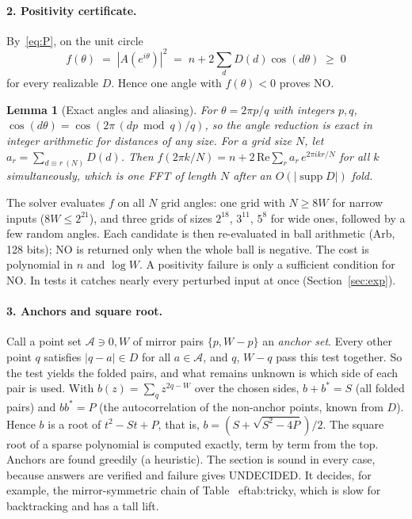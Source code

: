 \documentclass[11pt]{article}
\newtheorem{lemma}{Lemma}
\theoremstyle{definition}
\DeclareMathOperator{\supp}{supp}
\begin{document}
\paragraph{2. Positivity certificate.} By~\eqref{eq:P}, on the unit circle
\[
  f(\theta) \;=\; |A(e^{i\theta})|^2 \;=\; n + 2\sum_d D(d)\cos(d\theta) \;\ge\; 0
\]
for every realizable $D$. Hence one angle with $f(\theta)<0$ proves NO.

\begin{lemma}[Exact angles and aliasing]\label{lem:alias}
For $\theta=2\pi p/q$ with integers $p,q$, $\cos(d\theta)=\cos(2\pi\,(dp \bmod q)/q)$, so the angle reduction is exact
in integer arithmetic for distances of any size. For a grid size $N$, let $a_r=\sum_{d\equiv r \ (N)} D(d)$. Then
$f(2\pi k/N) = n + 2\,\mathrm{Re}\sum_{r} a_r\, e^{2\pi i kr/N}$ for all $k$ simultaneously, which is one FFT of
length $N$ after an $O(|\supp D|)$ fold.
\end{lemma}

The solver evaluates $f$ on all $N$ grid angles: one grid with $N\ge 8W$ for narrow inputs ($8W\le 2^{21}$), and three grids of sizes $2^{18}$,
$3^{11}$, $5^8$ for wide ones, followed by a few random angles. Each candidate is then re-evaluated in ball arithmetic
(Arb, 128 bits); NO is returned only when the whole ball is negative. The cost is polynomial in $n$ and $\log W$. A
positivity failure is only a sufficient condition for NO. In tests it catches nearly every perturbed input at once
(Section~\ref{sec:exp}).

\paragraph{3. Anchors and square root.} Call a point set $\mathcal A\ni 0,W$ of mirror pairs $\{p,W-p\}$ an
\emph{anchor set}. Every other point $q$ satisfies $|q-a|\in D$ for all $a\in\mathcal A$, and $q$, $W-q$ pass this
test together. So the test yields the folded pairs, and what remains unknown is which side of each pair is used. With
$b(z)=\sum_q z^{2q-W}$ over the chosen sides, $b+b^* = S$ (all folded pairs) and $bb^*=P$ (the autocorrelation of the
non-anchor points, known from $D$). Hence $b$ is a root of $t^2-St+P$, that is, $b=(S+\sqrt{S^2-4P})/2$. The square
root of a sparse polynomial is computed exactly, term by term from the top. Anchors are found greedily (a
heuristic). The section is sound in every case, because answers are verified and failure gives UNDECIDED. It decides,
for example, the mirror-symmetric chain of Table~
ef{tab:tricky}, which is slow for backtracking and has a tall lift.
\end{document}
